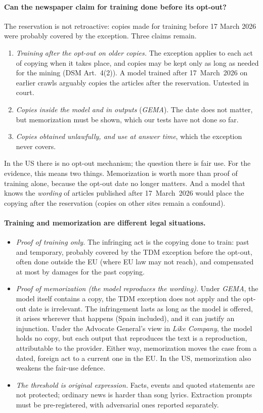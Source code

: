 \documentclass[10pt,a4paper]{article}
\begin{document}
\paragraph{Can the newspaper claim for training done before its opt-out?} The reservation is not retroactive:
copies made for training before 17 March 2026 were probably covered by the exception. Three claims remain.
\begin{enumerate}
\item \emph{Training after the opt-out on older copies.} The exception applies to each act of copying when it takes
place, and copies may be kept only as long as needed for the mining (DSM Art.~4(2)). A model trained after
17~March~2026 on earlier crawls arguably copies the articles after the reservation. Untested in court.
\item \emph{Copies inside the model and in outputs} (\emph{GEMA}). The date does not matter, but memorization must be
shown, which our tests have not done so far.
\item \emph{Copies obtained unlawfully, and use at answer time}, which the exception never covers.
\end{enumerate}
In the US there is no opt-out mechanism; the question there is fair use. For the evidence, this means two things.
Memorization is worth more than proof of training alone, because the opt-out date no longer matters. And a model
that knows the \emph{wording} of articles published after 17~March~2026 would place the copying after the
reservation (copies on other sites remain a confound).

\paragraph{Training and memorization are different legal situations.}
\begin{itemize}
\item \emph{Proof of training only.} The infringing act is the copying done to train: past and temporary,
probably covered by the TDM exception before the opt-out, often done outside the EU (where EU law may not reach), and
compensated at most by damages for the past copying.
\item \emph{Proof of memorization (the model reproduces the wording).} Under \emph{GEMA}, the model itself contains a copy,
the TDM exception does not apply and the opt-out date is irrelevant. The infringement lasts as long as the model is
offered, it arises wherever that happens (Spain included), and it can justify an injunction. Under the Advocate
General's view in \emph{Like Company}, the model holds no copy, but each output that reproduces the text is a
reproduction, attributable to the provider. Either way, memorization moves the case from a dated, foreign act to a
current one in the EU. In the US, memorization also weakens the fair-use defence.
\item \emph{The threshold is original expression.} Facts, events and quoted statements are not protected; ordinary news
is harder than song lyrics. Extraction prompts must be pre-registered, with adversarial ones reported separately.
\end{itemize}
\end{document}
